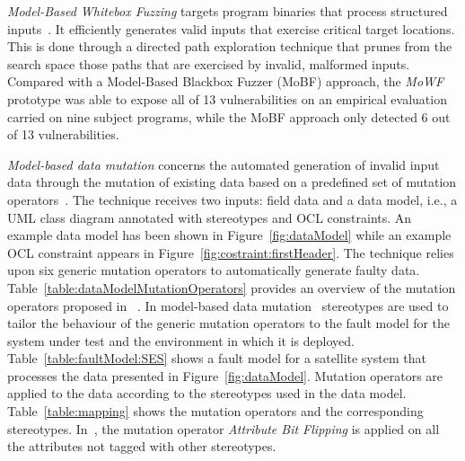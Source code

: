 
\emph{Model-Based Whitebox Fuzzing} targets program binaries that process structured inputs~\cite{pham2016model}. It efficiently generates valid inputs that exercise critical target locations. This is done through a directed path exploration technique that prunes from the search space those paths that are exercised by invalid, malformed inputs.
Compared with a Model-Based Blackbox Fuzzer (MoBF) approach, the \emph{MoWF} prototype was able to expose all of 13 vulnerabilities on an empirical evaluation carried on nine subject programs, while the MoBF approach only detected 6 out of 13 vulnerabilities. 



\emph{Model-based data mutation} concerns the automated generation of invalid input data through the mutation of existing data based on a predefined set of mutation operators~\cite{di2015generating}.
The technique receives two inputs: field data and a data model, i.e., a UML class diagram annotated with stereotypes and OCL constraints. 
An example data model has been shown in Figure~\ref{fig:dataModel} while an example OCL constraint appears in Figure~\ref{fig:costraint:firstHeader}. 
The technique relies upon six generic mutation operators to automatically generate faulty data. 
Table~\ref{table:dataModelMutationOperators} provides an overview of the mutation operators proposed in ~\cite{di2015generating}.
In model-based data mutation~\cite{di2015generating} stereotypes are used to tailor the behaviour of the generic mutation operators to the fault model for the system under test and the environment in which it is deployed. 
Table~\ref{table:faultModel:SES} shows a fault model for a satellite system that processes the data presented in Figure~\ref{fig:dataModel}.
Mutation operators are applied to the data according to the stereotypes used in the data model.
Table~\ref{table:mapping} shows the mutation operators and the corresponding stereotypes. In~\cite{di2015generating}, the mutation operator \emph{Attribute Bit Flipping} is applied on all the attributes not tagged with other stereotypes. 

